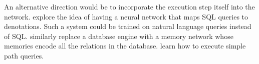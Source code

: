 \documentclass[11pt,letterpaper]{article}
\begin{document}
An alternative direction would be to incorporate the execution
step itself into the network.  
explore the idea of having a neural network that maps
SQL queries to denotations.  Such a system could be trained
on natural language queries instead of SQL.
similarly replace a database engine with a memory network
whose memories encode all the relations in the database.
 learn how to execute simple path queries.





\end{document}
